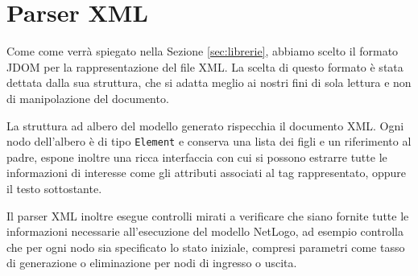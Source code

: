 %
%
%
%
%
%

\section{Parser XML}
\label{subsec:parser-builder}

Come come verrà spiegato nella Sezione \ref{sec:librerie}, abbiamo scelto il formato JDOM per la rappresentazione del file XML. La scelta di questo formato è stata dettata dalla sua struttura, che si adatta meglio ai nostri fini di sola lettura e non di manipolazione del documento.

La struttura ad albero del modello generato rispecchia il documento XML. Ogni nodo dell'albero è di tipo \texttt{Element} e conserva una lista dei figli e un riferimento al padre, espone inoltre una ricca interfaccia con cui si possono estrarre tutte le informazioni di interesse come gli attributi associati al tag rappresentato, oppure il testo sottostante.

Il parser XML inoltre esegue controlli mirati a verificare che siano fornite tutte le informazioni necessarie all'esecuzione del modello NetLogo, ad esempio controlla che per ogni nodo sia specificato lo stato iniziale, compresi parametri come tasso di generazione o eliminazione per nodi di ingresso o uscita.



